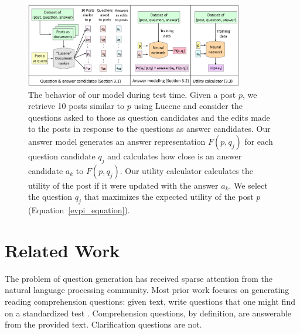 \documentclass[11pt,a4paper]{article}
\begin{document}
\begin{figure}[t]
	\centering
	\includegraphics[width=0.85\textwidth]{model}
	\caption{ The behavior of our model during test time. Given a post $p$, we retrieve 10 posts similar to $p$ using Lucene and consider the questions asked to those as question candidates and the edits made to the posts in response to the questions as answer candidates. Our answer model generates an answer representation $F(p,q_j)$ for each question candidate $q_j$ and calculates how close is an answer candidate $a_k$ to $F(p,q_j)$. Our utility calculator calculates the utility of the post if it were updated with the answer $a_k$. We select the question $q_j$ that maximizes the expected utility of the post $p$ (Equation~\ref{evpi_equation}).}
	\label{model}
	\vspace{-0.5em}
\end{figure}

\section{Related Work} \label{related_work}

The problem of question generation has received sparse attention from the natural language processing community. Most prior work focuses on generating reading comprehension questions:  given text, write questions that one might find on a standardized test \cite{vanderwende2008importance,heilman2011automatic,rus2011question,olney2012question}.  Comprehension questions, by definition, are answerable from the provided text. Clarification questions are not.  

\end{document}
